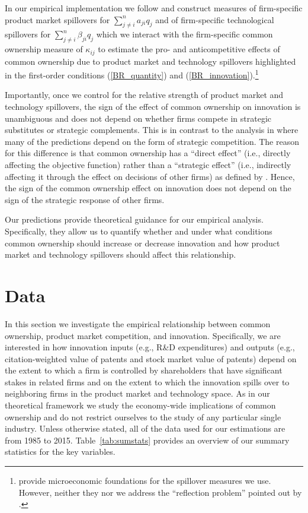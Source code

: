 \documentclass[12pt]{article}
\begin{document}
In our empirical implementation we follow \cite{bloom2013} and construct measures of firm-specific product market spillovers for $\sum_{j \neq i}^{n} a_{ji} q_{j}$ and of firm-specific technological spillovers for $\sum_{j \neq i}^{n} \beta_{ji} q_{j}$ which we interact with the firm-specific common ownership measure of $\kappa_{ij}$ to estimate the pro- and anticompetitive effects of common ownership due to product market and technology spillovers highlighted in the first-order conditions (\ref{BR_quantity}) and (\ref{BR_innovation}).\footnote{\cite{bloom2013} provide microeconomic foundations for the spillover measures we use. However, neither they nor we address the ``reflection problem'' pointed out by \cite{acemoglu2014}.}

Importantly, once we control for the relative strength of product market and technology spillovers, the sign of the effect of common ownership on innovation is unambiguous and does not depend on whether firms compete in strategic substitutes or strategic complements. This is in contrast to the analysis in \cite{bloom2013} where many of the predictions depend on the form of strategic competition. The reason for this difference is that common ownership has a ``direct effect'' (i.e., directly affecting the objective function) rather than a ``strategic effect'' (i.e., indirectly affecting it through the effect on decisions of other firms) as defined by \cite{fudenberg1984fat}. Hence, the sign of the common ownership effect on innovation does not depend on the sign of the strategic response of other firms.

Our predictions 
provide theoretical guidance for our empirical analysis. Specifically, they allow us to quantify whether and under what conditions common ownership should increase or decrease innovation and how product market and technology spillovers should affect this relationship.


\section{Data}
\label{sec:data}

In this section we investigate the empirical relationship between common ownership, product market competition, and innovation. Specifically, we are interested in how innovation inputs (e.g., R\&D expenditures) and outputs (e.g., citation-weighted value of patents and stock market value of patents) depend on the extent to which a firm is controlled by shareholders that have significant stakes in related firms and on the extent to which the innovation spills over to neighboring firms in the product market and technology space. As in our theoretical framework we study the economy-wide implications of common ownership and do not restrict ourselves to the study of any particular single industry. Unless otherwise stated, all of the data used for our estimations are from 1985 to 2015. Table~\ref{tab:sumstats} provides an overview of our summary statistics for the key variables. 
\end{document}
